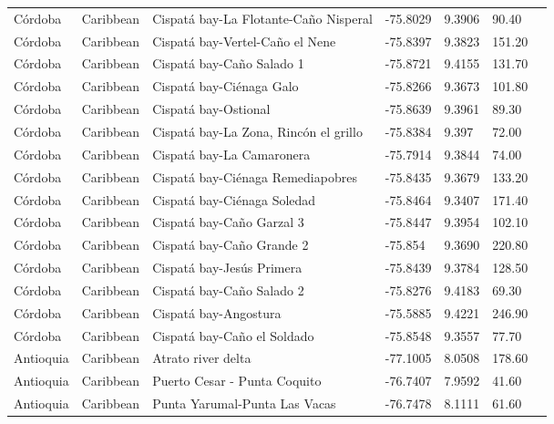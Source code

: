 \documentclass[authoryear]{elsarticle}   	%
\begin{document}
\begin{table}[htbp]
\begin{tabular}{p{2.0cm}p{2.0cm}p{4.0cm}p{1.0cm}p{1.0cm}p{2.0cm}p{2.5cm}}
C\'{o}rdoba&Caribbean&Cispat\'{a} bay-La Flotante-Ca\~{n}o Nisperal&-75.8029&9.3906&90.40&\citet{Bolivar_inpreparation}\\ 
C\'{o}rdoba&Caribbean&Cispat\'{a} bay-Vertel-Ca\~{n}o el Nene&-75.8397&9.3823&151.20&\citet{Bolivar_inpreparation}\\ 
C\'{o}rdoba&Caribbean&Cispat\'{a} bay-Ca\~{n}o Salado 1&-75.8721&9.4155&131.70&\citet{Bolivar_inpreparation}\\ 
C\'{o}rdoba&Caribbean&Cispat\'{a} bay-Ci\'{e}naga Galo&-75.8266&9.3673&101.80&\citet{Bolivar_inpreparation}\\ 
C\'{o}rdoba&Caribbean&Cispat\'{a} bay-Ostional&-75.8639&9.3961&89.30&\citet{Bolivar_inpreparation}\\ 
C\'{o}rdoba&Caribbean&Cispat\'{a} bay-La Zona, Rinc\'{o}n el grillo&-75.8384&9.397&72.00&\citet{Bolivar_inpreparation}\\ 
C\'{o}rdoba&Caribbean&Cispat\'{a} bay-La Camaronera&-75.7914&9.3844&74.00&\citet{Bolivar_inpreparation}\\ 
C\'{o}rdoba&Caribbean&Cispat\'{a} bay-Ci\'{e}naga Remediapobres&-75.8435&9.3679&133.20&\citet{Bolivar_inpreparation}\\ 
C\'{o}rdoba&Caribbean&Cispat\'{a}  bay-Ci\'{e}naga Soledad&-75.8464&9.3407&171.40&\citet{Bolivar_inpreparation}\\ 
C\'{o}rdoba&Caribbean&Cispat\'{a} bay-Ca\~{n}o Garzal 3&-75.8447&9.3954&102.10&\citet{Bolivar_inpreparation}\\ 
C\'{o}rdoba&Caribbean&Cispat\'{a} bay-Ca\~{n}o Grande 2&-75.854&9.3690&220.80&\citet{Bolivar_inpreparation}\\ 
C\'{o}rdoba&Caribbean&Cispat\'{a} bay-Jes\'{u}s Primera&-75.8439&9.3784&128.50&\citet{Bolivar_inpreparation}\\ 
C\'{o}rdoba&Caribbean&Cispat\'{a} bay-Ca\~{n}o Salado 2&-75.8276&9.4183&69.30&\citet{Bolivar_inpreparation}\\ 
C\'{o}rdoba&Caribbean&Cispat\'{a} bay-Angostura&-75.5885&9.4221&246.90&\citet{Bolivar_inpreparation}\\ 
C\'{o}rdoba&Caribbean&Cispat\'{a} bay-Ca\~{n}o el Soldado&-75.8548&9.3557&77.70&\citet{Bolivar_inpreparation}\\ 
Antioquia&Caribbean&Atrato river delta&-77.1005&8.0508&178.60&\citet{Blanco2012}\\ 
Antioquia&Caribbean&Puerto Cesar - Punta Coquito&-76.7407&7.9592&41.60&\citet{Blanco2012}\\ 
Antioquia&Caribbean&Punta Yarumal-Punta Las Vacas&-76.7478&8.1111&61.60&\citet{Blanco2012}\\ 

\end{tabular}
\end{table}
\end{document}
